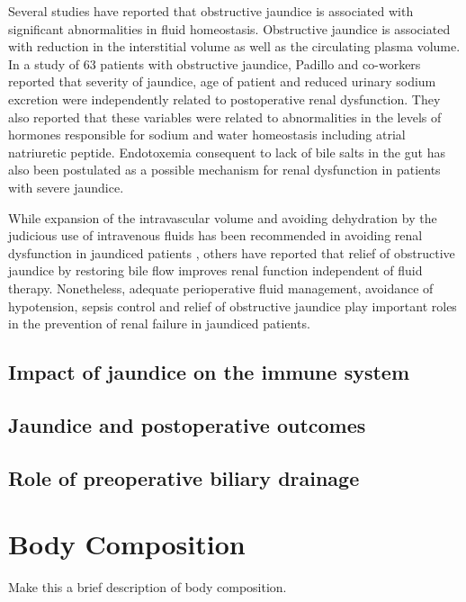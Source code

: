 Several studies have reported that obstructive jaundice is associated with significant abnormalities in fluid homeostasis. Obstructive jaundice is associated with reduction in the interstitial volume as well as the circulating plasma volume.\parencite{sitges-serra_body_1992, padillo_preoperative_1999} In a study of 63 patients with obstructive jaundice, Padillo and co-workers reported that severity of jaundice, age of patient and reduced urinary sodium excretion were independently related to postoperative renal dysfunction. They also reported that these variables were related to abnormalities in the levels of hormones responsible for sodium and water homeostasis including atrial natriuretic peptide.\parencite{padillo_multivariate_2005} Endotoxemia consequent to lack of bile salts in the gut has also been postulated as a possible mechanism for renal dysfunction in patients with severe jaundice.\parencite{bailey_endotoxin_1976}

While expansion of the intravascular volume and avoiding dehydration by the judicious use of intravenous fluids has been recommended in avoiding renal dysfunction in jaundiced patients \parencite{parks_prospective_1994}, others have reported that relief of obstructive jaundice by restoring bile flow improves renal function independent of fluid therapy.\parencite{padillo_randomized_2005} Nonetheless, adequate perioperative fluid management, avoidance of hypotension, sepsis control and relief of obstructive jaundice play important roles in the prevention of renal failure in jaundiced patients.

\subsection{Impact of jaundice on the immune system}

\subsection{Jaundice and postoperative outcomes}
\subsection{Role of preoperative biliary drainage}

\section{Body Composition}
Make this a brief description of body composition.